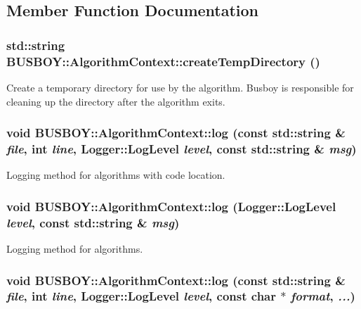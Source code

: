 \subsection{Member Function Documentation}
\hypertarget{classBUSBOY_1_1AlgorithmContext_ae745dab8a603182ecb4864582eba72a2}{
\subsubsection[{createTempDirectory}]{\setlength{\rightskip}{0pt plus 5cm}std::string BUSBOY::AlgorithmContext::createTempDirectory ()}}
\label{classBUSBOY_1_1AlgorithmContext_ae745dab8a603182ecb4864582eba72a2}


Create a temporary directory for use by the algorithm. Busboy is responsible for cleaning up the directory after the algorithm exits. \hypertarget{classBUSBOY_1_1AlgorithmContext_a5b7af6c6d4210beb4dc960e3f73b702b}{
\subsubsection[{log}]{\setlength{\rightskip}{0pt plus 5cm}void BUSBOY::AlgorithmContext::log (const std::string \& {\em file}, \/  int {\em line}, \/  {\bf Logger::LogLevel} {\em level}, \/  const std::string \& {\em msg})}}
\label{classBUSBOY_1_1AlgorithmContext_a5b7af6c6d4210beb4dc960e3f73b702b}


Logging method for algorithms with code location. \hypertarget{classBUSBOY_1_1AlgorithmContext_abbec3e4f56f5789e78a965bb34740273}{
\subsubsection[{log}]{\setlength{\rightskip}{0pt plus 5cm}void BUSBOY::AlgorithmContext::log ({\bf Logger::LogLevel} {\em level}, \/  const std::string \& {\em msg})}}
\label{classBUSBOY_1_1AlgorithmContext_abbec3e4f56f5789e78a965bb34740273}


Logging method for algorithms. \hypertarget{classBUSBOY_1_1AlgorithmContext_a9c7487e4a8e36878e06ceff4f15d69f4}{
\subsubsection[{log}]{\setlength{\rightskip}{0pt plus 5cm}void BUSBOY::AlgorithmContext::log (const std::string \& {\em file}, \/  int {\em line}, \/  {\bf Logger::LogLevel} {\em level}, \/  const char $\ast$ {\em format}, \/   {\em ...})}}
\label{classBUSBOY_1_1AlgorithmContext_a9c7487e4a8e36878e06ceff4f15d69f4}


